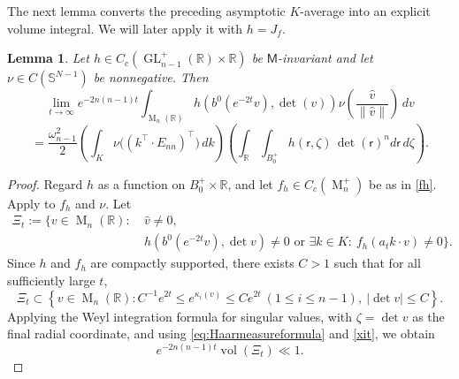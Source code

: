 \documentclass[reqno,11pt]{amsart}
\numberwithin{equation}{section}
\newtheorem{lemma}[theorem]{Lemma}
\theoremstyle{definition}
\theoremstyle{remark}
\newcommand{\op}{\operatorname}
\newcommand{\R}{\mathbb R}
\newcommand{\br}{\mathbb R}
\newcommand{\M}{\op{M}}
\renewcommand{\S}{\mathbb S}
\newcommand{\bp}{B_0^+}
\newcommand{\GL}{\op{GL}}
\renewcommand{\r}{\mathsf r}
\begin{document}
The next lemma converts the preceding asymptotic $K$-average into an explicit volume integral. We will later apply it with $h=J_f$.
\begin{lemma}\label{hfunctional}
Let $h\in C_c(\GL_{n-1}^+(\R)\times \R)$ be $\mathsf M$-invariant and let
$\nu\in C(\S^{N-1})$ be nonnegative.
Then
$$
\lim_{t\to\infty}
e^{-2n(n-1)t}
\int_{\M_n(\R)} h( b^0(e^{-2t}v),\det(v))
\nu\!\left(\frac{\widehat v}{\|\widehat v\|}\right)\,dv
$$
$$
=
\frac{\omega_{n-1}^2}{2}
\left(\int_K \nu\bigl((k^{\intercal}\!\cdot E_{nn})^{\intercal}\bigr)\,dk\right)
\left(
\int_{\R}\int_{\bp}
h(\r,\zeta)\,\det (\r)^n d\r \,d\zeta
\right).
$$
\end{lemma}
\begin{proof} Regard $h$ as a function on $B_0^+\times \br$, and
let  $f_h\in C_c(\M_n^+)$ be as in \eqref{fh}.
Apply  to $f_h$ and $\nu$. Let
\begin{equation*}
\begin{aligned}
\Xi_t:=\bigl\{v\in\M_n(\mathbb R):\ {}&\widehat v\ne0,\\
&h(b^0(e^{-2t}v),\det v)\ne0
\text{ or }\exists k\in K:\ f_h(a_tk\cdot v)\ne0\bigr\}.
\end{aligned}
\end{equation*}
Since $h$ and $f_h$ are compactly supported, there exists $C>1$ such that
for all sufficiently large $t$,
\begin{equation}\label{xit}
\Xi_t\subset
\left\{
v\in \M_n(\R):
C^{-1}e^{2t}\le e^{\kappa_i(v)}\le Ce^{2t}\ (1\le i\le n-1),\
|\det v|\le C
\right\}.
\end{equation}
Applying the Weyl integration formula for singular values, with
$\zeta=\det v$ as the final radial coordinate, and
using \eqref{eq:Haarmeasureformula} and \eqref{xit}, we obtain 
\begin{equation}\label{eq:Xi-volume}
e^{-2n(n-1)t}\operatorname{vol}(\Xi_t)\ll1.
\end{equation}



\end{proof}
\end{document}
